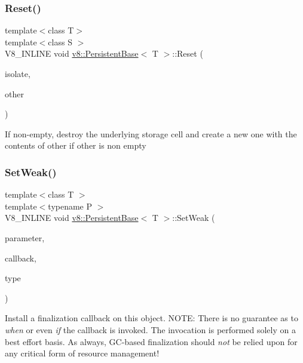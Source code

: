 \subsubsection{\texorpdfstring{Reset()}{Reset()}\hspace{0.1cm}{\footnotesize\ttfamily [3/3]}}
{\footnotesize\ttfamily template$<$class T$>$ \\
template$<$class S $>$ \\
V8\+\_\+\+I\+N\+L\+I\+NE void \mbox{\hyperlink{classv8_1_1PersistentBase}{v8\+::\+Persistent\+Base}}$<$ T $>$\+::Reset (\begin{DoxyParamCaption}\item[{Isolate $\ast$}]{isolate,  }\item[{const \mbox{\hyperlink{classv8_1_1PersistentBase}{Persistent\+Base}}$<$ S $>$ \&}]{other }\end{DoxyParamCaption})}

If non-\/empty, destroy the underlying storage cell and create a new one with the contents of other if other is non empty \mbox{\label{classv8_1_1PersistentBase_aebb8a2c97e219102f613ff3749c956f6}} 
\subsubsection{\texorpdfstring{Set\+Weak()}{SetWeak()}\hspace{0.1cm}{\footnotesize\ttfamily [1/2]}}
{\footnotesize\ttfamily template$<$class T $>$ \\
template$<$typename P $>$ \\
V8\+\_\+\+I\+N\+L\+I\+NE void \mbox{\hyperlink{classv8_1_1PersistentBase}{v8\+::\+Persistent\+Base}}$<$ T $>$\+::Set\+Weak (\begin{DoxyParamCaption}\item[{P $\ast$}]{parameter,  }\item[{typename \mbox{\hyperlink{classv8_1_1WeakCallbackInfo}{Weak\+Callback\+Info}}$<$ P $>$\+::Callback}]{callback,  }\item[{Weak\+Callback\+Type}]{type }\end{DoxyParamCaption})}

Install a finalization callback on this object. N\+O\+TE\+: There is no guarantee as to {\itshape when} or even {\itshape if} the callback is invoked. The invocation is performed solely on a best effort basis. As always, G\+C-\/based finalization should {\itshape not} be relied upon for any critical form of resource management! 

